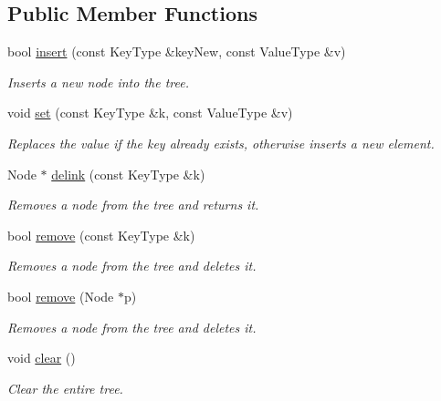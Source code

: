\subsection*{Public Member Functions}
\begin{DoxyCompactItemize}
\item 
bool \hyperlink{classirr_1_1core_1_1map_af9f8f34cab620e3bdc1ae72715ab9d15}{insert} (const Key\+Type \&key\+New, const Value\+Type \&v)
\begin{DoxyCompactList}\small\item\em Inserts a new node into the tree. \end{DoxyCompactList}\item 
void \hyperlink{classirr_1_1core_1_1map_ae31213e9478dd259bdd79c7fd3249584}{set} (const Key\+Type \&k, const Value\+Type \&v)
\begin{DoxyCompactList}\small\item\em Replaces the value if the key already exists, otherwise inserts a new element. \end{DoxyCompactList}\item 
Node $\ast$ \hyperlink{classirr_1_1core_1_1map_a6f95533c709ef2dbe17148442aa26984}{delink} (const Key\+Type \&k)
\begin{DoxyCompactList}\small\item\em Removes a node from the tree and returns it. \end{DoxyCompactList}\item 
bool \hyperlink{classirr_1_1core_1_1map_a83d8a6261249668ae6a0f2bbd6e84c26}{remove} (const Key\+Type \&k)
\begin{DoxyCompactList}\small\item\em Removes a node from the tree and deletes it. \end{DoxyCompactList}\item 
bool \hyperlink{classirr_1_1core_1_1map_a8f8ee85b87b3764be03d78ba696e75f2}{remove} (Node $\ast$p)
\begin{DoxyCompactList}\small\item\em Removes a node from the tree and deletes it. \end{DoxyCompactList}\item 
\mbox{\label{classirr_1_1core_1_1map_a0f7e7fdbb5ec7794851e32c9716dace0}} 
void \hyperlink{classirr_1_1core_1_1map_a0f7e7fdbb5ec7794851e32c9716dace0}{clear} ()
\begin{DoxyCompactList}\small\item\em Clear the entire tree. \end{DoxyCompactList}\item 

\end{DoxyCompactItemize}
